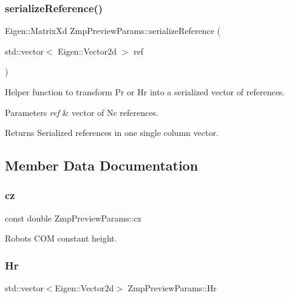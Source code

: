 \subsubsection{\texorpdfstring{serialize\+Reference()}{serializeReference()}}
{\footnotesize\ttfamily Eigen\+::\+Matrix\+Xd Zmp\+Preview\+Params\+::serialize\+Reference (\begin{DoxyParamCaption}\item[{std\+::vector$<$ Eigen\+::\+Vector2d $>$}]{ref }\end{DoxyParamCaption})\hspace{0.3cm}{\ttfamily [inline]}}

Helper function to transform Pr or Hr into a serialized vector of references.


\begin{DoxyParams}{Parameters}
{\em ref} & vector of Nc references.\\
\hline
\end{DoxyParams}
\begin{DoxyReturn}{Returns}
Serialized references in one single column vector. 
\end{DoxyReturn}


\subsection{Member Data Documentation}
\hypertarget{structZmpPreviewParams_a19d944dc7a6b40e6e55068a62d33e546}{}\label{structZmpPreviewParams_a19d944dc7a6b40e6e55068a62d33e546} 
\subsubsection{\texorpdfstring{cz}{cz}}
{\footnotesize\ttfamily const double Zmp\+Preview\+Params\+::cz}

Robot\textquotesingle{}s C\+OM constant height. \hypertarget{structZmpPreviewParams_a5dc49bed0a434fd99f74517185792456}{}\label{structZmpPreviewParams_a5dc49bed0a434fd99f74517185792456} 
\subsubsection{\texorpdfstring{Hr}{Hr}}
{\footnotesize\ttfamily std\+::vector$<$Eigen\+::\+Vector2d$>$ Zmp\+Preview\+Params\+::\+Hr}

